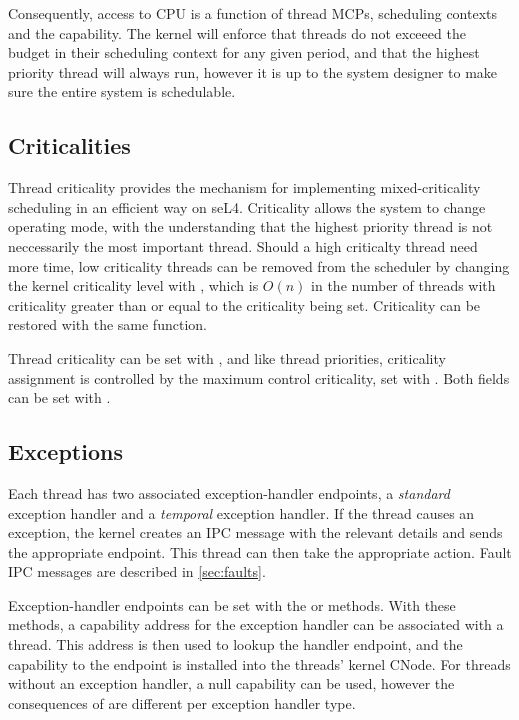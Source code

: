 Consequently, access to CPU is a function of thread MCPs, scheduling contexts and the  capability.
The kernel will enforce that threads do not exceeed the budget in their scheduling context for any given period, and that the highest priority thread will always run, however it is up to the system designer to make sure the entire system is schedulable.

\subsection{Criticalities}
\label{sec:criticality}

Thread criticality provides the mechanism for implementing mixed-criticality scheduling in an efficient way on seL4.
Criticality allows the system to change operating mode, with the understanding that the highest priority thread is not neccessarily the most important thread.
Should a high criticalty thread need more time, low criticality threads can be removed from the scheduler by changing the kernel criticality level with , which is $O(n)$ in the number of threads with criticality greater than or equal to the criticality being set.
Criticality can be restored with the same function.

Thread criticality can be set with , and like thread priorities, criticality assignment is controlled by the maximum control criticality, set with .
Both fields can be set with .

\subsection{Exceptions}
\label{sec:exceptions}

Each thread has two associated exception-handler endpoints, a \emph{standard} exception handler and a \emph{temporal} exception handler.
If the thread
causes an exception, the kernel creates an IPC message with the relevant
details and sends the appropriate endpoint. This
thread can then take the appropriate action. Fault IPC messages are
described in \autoref{sec:faults}.

Exception-handler
endpoints can be set with the  or
 methods.
With these methods, a capability address for the exception handler can be associated with a thread.
This address is then used to lookup the handler endpoint, and the capability to the endpoint is installed into the threads' kernel CNode.
For threads without an exception handler, a null capability can be used, however the consequences of are different per exception handler type.

